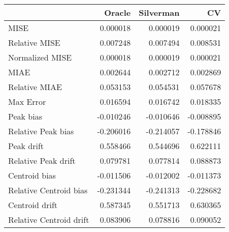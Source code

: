 \begin{tabular}{lrrr}
  \hline
 & Oracle & Silverman & CV \\ 
  \hline
MISE & 0.000018 & 0.000019 & 0.000021 \\ 
  Relative MISE & 0.007248 & 0.007494 & 0.008531 \\ 
  Normalized MISE & 0.000018 & 0.000019 & 0.000021 \\ 
  MIAE & 0.002644 & 0.002712 & 0.002869 \\ 
  Relative MIAE & 0.053153 & 0.054531 & 0.057678 \\ 
  Max Error & 0.016594 & 0.016742 & 0.018335 \\ 
  Peak bias & -0.010246 & -0.010646 & -0.008895 \\ 
  Relative Peak bias & -0.206016 & -0.214057 & -0.178846 \\ 
  Peak drift & 0.558466 & 0.544696 & 0.622111 \\ 
  Relative Peak drift & 0.079781 & 0.077814 & 0.088873 \\ 
  Centroid bias & -0.011506 & -0.012002 & -0.011373 \\ 
  Relative Centroid bias & -0.231344 & -0.241313 & -0.228682 \\ 
  Centroid drift & 0.587345 & 0.551713 & 0.630365 \\ 
  Relative Centroid drift & 0.083906 & 0.078816 & 0.090052 \\ 
   \hline
\end{tabular}

